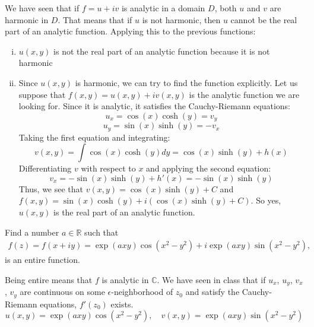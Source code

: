 \documentclass{report}
\def\C{\mathbb{C}}
\def\R{\mathbb{R}}
\renewcommand{\exp}[1]{\operatorname{exp}\left(#1\right)}
\renewcommand{\sin}[1]{\operatorname{sin}\left(#1\right)}
\renewcommand{\cos}[1]{\operatorname{cos}\left(#1\right)}
\renewcommand{\sinh}[1]{\operatorname{sinh}\left(#1\right)}
\renewcommand{\cosh}[1]{\operatorname{cosh}\left(#1\right)}
\begin{document}
    We have seen that if $f = u + iv$ is analytic in a domain $D$, both $u$ and $v$ are harmonic in $D$. That means that if $u$ is not harmonic, then $u$ cannot be the real part of an analytic function. Applying this to the previous functions:
    \begin{enumerate}[(i)]
        \item $u(x,y)$ is not the real part of an analytic function because it is not harmonic
        \item Since $u(x,y)$ is harmonic, we can try to find the function explicitly. Let us suppose that $f(x,y)=u(x,y)+iv(x,y)$ is the analytic function we are looking for. Since it is analytic, it satisfies the Cauchy-Riemann equations:
        \begin{equation*}
            u_x=\cos{x}\cosh{y}=v_y
        \end{equation*}
        \begin{equation*}
            u_y=\sin{x}\sinh{y}=-v_x
        \end{equation*}
        Taking the first equation and integrating:
        \begin{equation*}
            v(x,y)=\int\cos{x}\cosh{y}dy=\cos{x}\sinh{y}+h(x)
        \end{equation*}
        Differentiating $v$ with respect to $x$ and applying the second equation:
        \begin{equation*}
            v_x=-\sin{x}\sinh{y} + h'(x) = -\sin{x}\sinh{y}
        \end{equation*}
        Thus, we see that $v(x,y)=\cos{x}\sinh{y} + C$ and $f(x,y)= \sin{x}\cosh{y}+i(\cos{x}\sinh{y} + C)$. So yes, $u(x,y)$ is the real part of an analytic function.
    \end{enumerate}
    \begin{tcolorbox}[title=Part c]
        Find a number $a\in\R$ such that
        \begin{align*}
            f(z)=f(x+iy)=\exp{axy}\cos{x^2-y^2}+i\exp{axy}\sin{x^2-y^2},
        \end{align*}
        is an entire function.
    \end{tcolorbox}
    Being entire means that $f$ is analytic in $\C$. We have seen in class that if $u_x$, $u_y$, $v_x$, $v_y$ are continuous on some $\epsilon$-neighborhood of $z_0$ and satisfy the Cauchy-Riemann equations, $f'(z_0)$ exists.
    \begin{equation*}
        u(x,y)=\exp{axy}\cos{x^2-y^2}, \quad v(x,y)=\exp{axy}\sin{x^2-y^2}
    \end{equation*}
\end{document}
